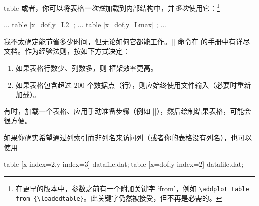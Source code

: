 {\begin{addplotoperation}[]{table}{}
或者，你可以将表格\emph{一次性}加载到内部结构中，并\emph{多次}使用它：\footnote{在更早的版本中，参数之前有一个附加关键字 `from'，例如 \texttt{\textbackslash addplot table from \{\textbackslash loadedtable\}}。此关键字仍然被接受，但不再是必需的。}
%
\begin{codeexample}
\loadedtable %
...
\addplot table [x=dof,y=L2] {\loadedtable};
...
\addplot table [x=dof,y=Lmax] {\loadedtable};
...
\end{codeexample}
%
我不太确定能节省多少时间，但无论如何它都能工作。|\pgfplotstableread| 命令在 \PGFPlotstable{} 的手册中有详尽文档。作为经验法则，按如下方式决定：
%
\begin{enumerate}
    \item 如果表格行数少、列数多，则  框架效率更高。
    \item 如果表格包含超过 $200$ 个数据点（行），则应始终使用文件输入（必要时重新加载）。
\end{enumerate}
%
有时，加载一个表格、应用手动准备步骤（例如 |\pgfplotstabletranspose|），然后绘制结果表格，可能会很方便。

如果你确实希望通过列索引而非列名来访问列（或者你的表格没有列名），也可以使用
%
\begin{codeexample}
\addplot table [x index=2,y index=3] {datafile.dat};
\addplot table [x=dof,y index=2]     {datafile.dat};
\end{codeexample}


\end{addplotoperation}}
